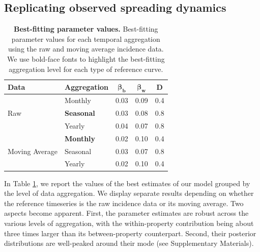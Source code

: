 \documentclass[aps,physrev,reprint,superscriptaddress]{revtex4-1}
\begin{document}
\subsection{Replicating observed spreading dynamics}

\begin{table}[ht]
\centering
\renewcommand{\arraystretch}{1.2}
\setlength{\tabcolsep}{8pt}
\begin{tabular}{|l|l|c|c|c|}
\hline
\textbf{Data} & \textbf{Aggregation} & $\boldsymbol{\beta_b}$ & $\boldsymbol{\beta_w}$ & $\boldsymbol{D}$ \\
\hline
\multirow{3}{*}{Raw}
 & Monthly  & 0.03 & 0.09 & 0.4 \\
 & \textbf{Seasonal} & 0.03 & 0.08 & 0.8 \\
 & Yearly   & 0.04 & 0.07 & 0.8 \\
\hline
\multirow{3}{*}{Moving Average}
 & \textbf{Monthly}  & 0.02 & 0.10 & 0.4 \\
 & Seasonal & 0.03 & 0.07 & 0.8 \\
 & Yearly   & 0.02 & 0.10 & 0.4 \\
\hline
\end{tabular}
\caption{\textbf{Best-fitting parameter values.} Best-fitting parameter values for each temporal aggregation using the raw and moving average incidence data. 
We use bold-face fonts to highlight the best-fitting aggregation level for each type of reference curve.
}
\label{tab:best_params}
\end{table}


In Table \ref{tab:best_params}, we report the values of the best estimates of our model grouped by the level of data aggregation. We display separate results depending on whether the reference timeseries is the raw incidence data or its moving average. Two aspects become apparent. First, the parameter estimates are robust across the various levels of aggregation, with the within-property contribution being about three times larger than its between-property counterpart. Second, their posterior distributions are well-peaked around their mode (see Supplementary Materials).
\end{document}
